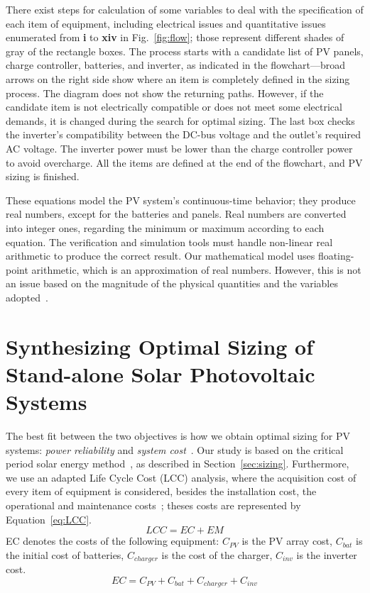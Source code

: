 \documentclass[journal]{IEEEtran}
\begin{document}
There exist steps for calculation of some variables to deal with the specification of each item of equipment, including electrical issues and quantitative issues enumerated from \textbf{i} to \textbf{xiv} in Fig.~\ref{fig:flow}; those represent different shades of gray of the rectangle boxes. The process starts with a candidate list of PV panels, charge controller, batteries, and inverter, as indicated in the flowchart—broad arrows on the right side show where an item is completely defined in the sizing process. The diagram does not show the returning paths. However, if the candidate item is not electrically compatible or does not meet some electrical demands, it is changed during the search for optimal sizing. The last box checks the inverter's compatibility between the DC-bus voltage and the outlet's required AC voltage. The inverter power must be lower than the charge controller power to avoid overcharge. All the items are defined at the end of the flowchart, and PV sizing is finished.

These equations model the PV system's continuous-time behavior; they produce real numbers, except for the batteries and panels. Real numbers are converted into integer ones, regarding the minimum or maximum according to each equation. The verification and simulation tools must handle non-linear real arithmetic to produce the correct result. Our mathematical model uses floating-point arithmetic, which is an approximation of real numbers. However, this is not an issue based on the magnitude of the physical quantities and the variables adopted~\cite{DBLP:journals/corr/abs-2004-12699}.

\section{Synthesizing Optimal Sizing of Stand-alone Solar Photovoltaic Systems}
\label{sec:SynthesizingOptimalSolarPhotovoltaicSystems}
The best fit between the two objectives is how we obtain optimal sizing for PV systems: \textit{power reliability} and \textit{system cost}~\cite{Alsadi2018}. Our study is based on the critical period solar energy method~\cite{Pinho}, as described in Section~\ref{sec:sizing}. Furthermore, we use an adapted Life Cycle Cost (LCC) analysis, where the acquisition cost of every item of equipment is considered, besides the installation cost, the operational and maintenance costs~\cite{Alsadi2018}; theses costs are represented by Equation~\ref{eq:LCC}.
%
\begin{equation}
\label{eq:LCC}
LCC = EC + EM
\end{equation}
%
\noindent EC denotes the costs of the following equipment: $C_{PV}$ is the PV array cost, $C_{bat}$ is the initial cost of batteries, $C_{charger}$ is the cost of the charger, $C_{inv}$ is the inverter cost.
\begin{equation}
\label{eq:EquipamentCost}
EC = C_{PV} + C_{bat} + C_{charger} + C_{inv}
\end{equation}
\end{document}
